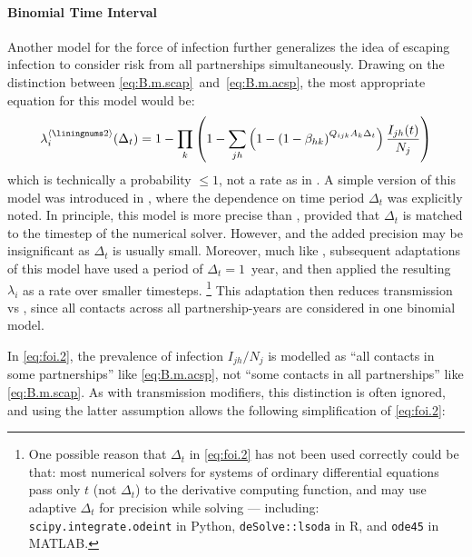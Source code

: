 \paragraph{ Binomial Time Interval}
Another model for the force of infection
further generalizes the idea of escaping infection to consider
risk from all partnerships simultaneously.
Drawing on the distinction between \eqref{eq:B.m.scap}~and~\eqref{eq:B.m.acsp},
the most appropriate equation for this model would be:
\begin{equation}\label{eq:foi.2}
  \lambda_i^{\case{2}}(\Delta_t) =
  1 - \prod_{k}\left(1 - \sum_{jh} \left(1 -
  {\left(1 - \beta_{hk}\right)}^{Q_{ijk} A_k \Delta_t}\right) \frac{I_{jh}(t)}{N_j}\right)
\end{equation}
which is technically a probability $\le 1$, not a rate as in .
A simple version of this model was introduced in \cite{Auvert1990},
where the dependence on time period $\Delta_t$ was explicitly noted.
In principle, this model is more precise than ,
provided that $\Delta_t$ is matched to the timestep of the numerical solver.
However, and the added precision may be insignificant as $\Delta_t$ is usually small.
Moreover, much like , subsequent adaptations of this model have
used a period of $\Delta_t = 1$~year,
and then applied the resulting $\lambda_i$ as a rate over smaller timesteps.%
\footnote{One possible reason that $\Delta_t$ in \eqref{eq:foi.2}
  has not been used correctly could be that:
  most numerical solvers for systems of ordinary differential equations
  pass only $t$ (not $\Delta_t$) to the derivative computing function,
  and may use adaptive $\Delta_t$ for precision while solving --- including:
  \texttt{scipy.integrate.odeint} in Python,
  \texttt{deSolve::lsoda} in R, and
  \texttt{ode45} in MATLAB.}
This adaptation then reduces transmission vs ,
since all contacts across all partnership-years
are considered in one binomial model.
\par
In \eqref{eq:foi.2}, the prevalence of infection $I_{jh}/N_j$ is
modelled as ``all contacts in some partnerships'' like \eqref{eq:B.m.acsp},
not ``some contacts in all partnerships'' like \eqref{eq:B.m.scap}.
As with transmission modifiers, this distinction is often ignored,
and using the latter assumption allows the following simplification of \eqref{eq:foi.2}:%

